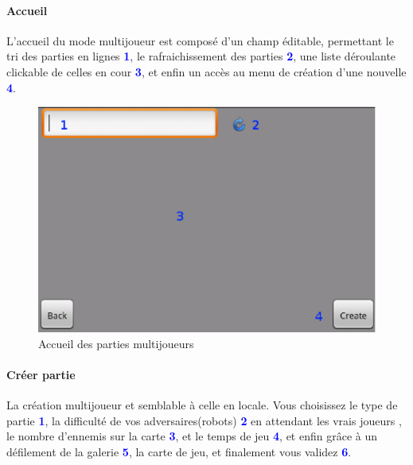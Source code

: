 	\paragraph{Accueil}
	L'accueil du mode multijoueur est composé d'un champ éditable, permettant le
	tri des parties en lignes \textcolor{blue}{\textbf{1}}, le rafraichissement des
	parties \textcolor{blue}{\textbf{2}}, une liste déroulante clickable de celles
	en cour \textcolor{blue}{\textbf{3}}, et enfin un accès au menu de création
	d'une nouvelle \textcolor{blue}{\textbf{4}}.
	
	\begin{figure}[h]
	\centering
		\includegraphics[scale=0.7]{Manuel/Img/19.eps}
		\caption{Accueil des parties multijoueurs}
	\end{figure}
	
	\paragraph{Créer partie}
	La création multijoueur et semblable à celle en locale.
	Vous choisissez le type de partie
	\textcolor{blue}{\textbf{1}}, la difficulté de vos adversaires(robots)
	\textcolor{blue}{\textbf{2}} en attendant les vrais joueurs , le nombre d'ennemis
	sur la carte \textcolor{blue}{\textbf{3}}, et le temps de jeu \textcolor{blue}{\textbf{4}},
	et enfin grâce à un défilement de la galerie \textcolor{blue}{\textbf{5}}, la
	carte de jeu, et finalement vous validez \textcolor{blue}{\textbf{6}}.
	
